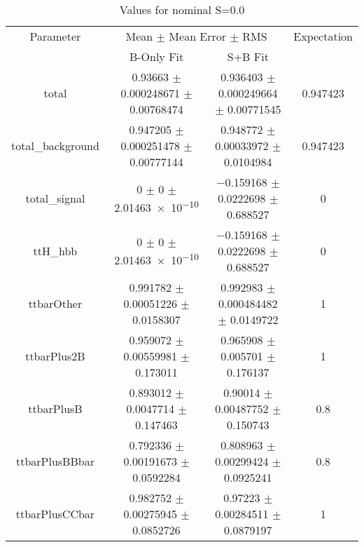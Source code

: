 \begin{table}
\centering
\caption{Values for nominal S=0.0}
\begin{tabular}{cccc}
\toprule
Parameter & \multicolumn{2}{c}{Mean $\pm$ Mean Error $\pm$ RMS} & Expectation\\
 & B-Only Fit & S+B Fit & \\
\midrule
total & \num{0.93663} $\pm$ \num{0.000248671} $\pm$ \num{0.00768474} & \num{0.936403} $\pm$ \num{0.000249664} $\pm$ \num{0.00771545} & \num{0.947423}\\
total\_background & \num{0.947205} $\pm$ \num{0.000251478} $\pm$ \num{0.00777144} & \num{0.948772} $\pm$ \num{0.00033972} $\pm$ \num{0.0104984} & \num{0.947423}\\
total\_signal & \num{0} $\pm$ \num{0} $\pm$ \num{2.01463e-10} & \num{-0.159168} $\pm$ \num{0.0222698} $\pm$ \num{0.688527} & \num{0}\\
ttH\_hbb & \num{0} $\pm$ \num{0} $\pm$ \num{2.01463e-10} & \num{-0.159168} $\pm$ \num{0.0222698} $\pm$ \num{0.688527} & \num{0}\\
ttbarOther & \num{0.991782} $\pm$ \num{0.00051226} $\pm$ \num{0.0158307} & \num{0.992983} $\pm$ \num{0.000484482} $\pm$ \num{0.0149722} & \num{1}\\
ttbarPlus2B & \num{0.959072} $\pm$ \num{0.00559981} $\pm$ \num{0.173011} & \num{0.965908} $\pm$ \num{0.005701} $\pm$ \num{0.176137} & \num{1}\\
ttbarPlusB & \num{0.893012} $\pm$ \num{0.0047714} $\pm$ \num{0.147463} & \num{0.90014} $\pm$ \num{0.00487752} $\pm$ \num{0.150743} & \num{0.8}\\
ttbarPlusBBbar & \num{0.792336} $\pm$ \num{0.00191673} $\pm$ \num{0.0592284} & \num{0.808963} $\pm$ \num{0.00299424} $\pm$ \num{0.0925241} & \num{0.8}\\
ttbarPlusCCbar & \num{0.982752} $\pm$ \num{0.00275945} $\pm$ \num{0.0852726} & \num{0.97223} $\pm$ \num{0.00284511} $\pm$ \num{0.0879197} & \num{1}\\
\bottomrule
\end{tabular}
\end{table}